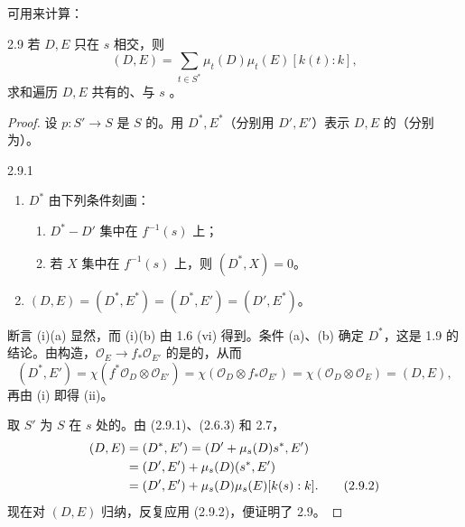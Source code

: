 可用来计算：
\begin{SGAresult}{}{2.9}
若 $D,E$ 只在 $s$ 相交，则
\[
(D,E)=\sum_{t\in S^*}\mu_t(D)\mu_t(E)[k(t):k],
\]
求和遍历 $D,E$ 共有的、与 $s$ 。
\end{SGAresult}
\begin{proof}
设 $p:S'\to S$ 是 $S$ 的。用 $D^*,E^*$（分别用 $D',E'$）表示 $D,E$ 的（分别为）。
\begin{SGAresult}{}{2.9.1}
\begin{enumerate}
\item[(i)]  $D^*$ 由下列条件刻画：
\begin{enumerate}
\item[(a)] $D^*-D'$ 集中在 $f^{-1}(s)$ 上；
\item[(b)] 若 $X$ 集中在 $f^{-1}(s)$ 上，则 $(D^*,X)=0$。
\end{enumerate}
\item[(ii)] $(D,E)=(D^*,E^*)=(D^*,E')=(D',E^*)$。
\end{enumerate}
\end{SGAresult}
断言 (i)(a) 显然，而 (i)(b) 由 1.6 (vi) 得到。条件 (a)、(b) 确定 $D^*$，这是 1.9 的结论。由构造，$\mathcal O_E\to f_*\mathcal O_{E'}$ 的是的，从而
\[
(D^*,E')=\chi(f^*\mathcal O_D\otimes\mathcal O_{E'})
=\chi(\mathcal O_D\otimes f_*\mathcal O_{E'})
=\chi(\mathcal O_D\otimes\mathcal O_E)=(D,E),
\]
再由 (i) 即得 (ii)。

取 $S'$ 为 $S$ 在 $s$ 处的。由 (2.9.1)、(2.6.3) 和 2.7，
\begin{align}
(D,E)&=(D^*,E')=(D'+\mu_s(D)s^*,E')\notag\\
&=(D',E')+\mu_s(D)(s^*,E')\notag\\
&=(D',E')+\mu_s(D)\mu_s(E)[k(s):k].\tag{2.9.2}
\end{align}
现在对 $(D,E)$ 归纳，反复应用 (2.9.2)，便证明了 2.9。
\end{proof}

